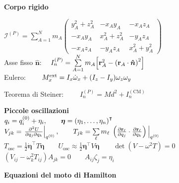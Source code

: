 \documentclass[a4paper,7pt]{article}
\begin{document}
	\begin{minipage}{0.45\textwidth}
		\vspace{-1.4 cm}
		
		\textbf{Corpo rigido}\\
		
		
		\vspace{0.2 cm}
		
		$\mathcal{I}^{(P)}=\sum\limits_{A=1}^Nm_A\begin{pmatrix}
			y_A^2+z_A^2 & -x_Ay_A & -x_Az_A\\
			-x_Ay_A & x_A^2+z_A^2 & -y_Az_A\\
			-x_Az_A & -y_Az_A & x_A^2+y_A^2
		\end{pmatrix}$\\
		
		Asse fisso $\boldsymbol{\hat{n}}$: $\quad I_n^{(P)}=\sum\limits_{A=1}^Nm_A\qty[\mathbf{r}_A^2-\qty(\mathbf{r}_A\cdot\boldsymbol{\hat{n}})^2]$\\
		
		Eulero: $\qquad
			M_x^{\text{ext}}=I_x\dot{\omega}_x+\qty(I_z-I_y)\omega_z\omega_y$
			
		\vspace{0.2 cm}
		
		Teorema di Steiner: $\qquad I_{n}^{(P)}=Md^2+I_{n}^{(\text{CM})}$\\
		\vspace{0.5 cm}
		
		\textbf{Piccole oscillazioni}\\
		
		$q_i=q_i^{(0)}+\eta_i,\qquad \boldsymbol{\eta}=\qty(\eta_1,\dots,\eta_n)^\intercal$\\
		
		$V_{jk}=\eval{\frac{\partial^2U}{\partial q_j\partial q_k}}_{q^{(0)}},\qquad T_{jk}=\sum\limits_{\ell}m_\ell\,\eval{\left(\pdv{\mathbf{r}_\ell}{q_j}\cdot\pdv{\mathbf{r}_\ell}{q_k}\right)}_{q^{(0)}}$\\
		
		$T_{\text{osc}}=\frac{1}{2}\boldsymbol{\dot{\eta}}^\intercal T\boldsymbol{\dot{\eta}}\qquad U_{\text{osc}}\approx \frac{1}{2}\boldsymbol{\eta}^\intercal V\boldsymbol{\eta}\qquad \det(V-\omega^2T)=0$\\
		
		$\left(V_{ij}-\omega^2_kT_{ij}\right)A_{jk}=0\qquad A_{ij}\zeta_j=\eta_i $
		\vspace{0.5 cm}
		
		\textbf{Equazioni del moto di Hamilton}\\
		

\end{minipage}
\end{document}
